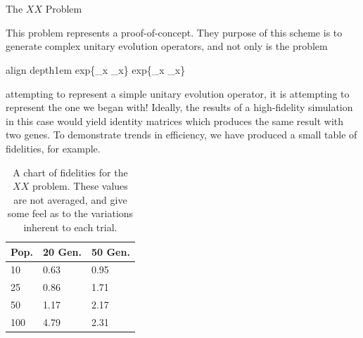 \documentclass[12pt]{beamer}
\renewcommand{\maketitle}{%
	\begin{center}%
		\Huge\inserttitle\\[5mm]%
		\Large\insertauthor\\[5mm]%
		\Large\insertinstitute%
	\end{center}%
	\vspace*{-1.5ex}%
}
\newcommand*\mystrut[1]{\vrule width0pt height0pt depth#1\relax}
\begin{document}
\begin{frame}{\maketitle}
\begin{columns}
\begin{column}{.45\textwidth}
	\begin{block}{The $XX$ Problem} \label{xx}

	This problem represents a proof-of-concept. They purpose of this scheme is to generate complex unitary evolution operators, and not only is the problem

	\begin{empheq}[box=\fbox]{align}
		\mystrut{1em} exp\{\sigma_x \otimes \sigma_x\} \mapsto exp\{\sigma_x \otimes \sigma_x\}
	\end{empheq}

	attempting to represent a simple unitary evolution operator, it is attempting to represent the one we began with! Ideally, the results of a high-fidelity simulation in this case would yield identity matrices which produces the same result with two genes. To demonstrate trends in efficiency, we have produced a small table of fidelities, for example. 

	\begin{table}[htpb]
		\centering
			\begin{tabular}{||l | l l ||} 
			\hline
				Pop. & 20 Gen. & 50 Gen. \\ [0.5ex] 
			\hline
				10  & 0.63   & 0.95      \\ 
				25  & 0.86   & 1.71      \\
				50  & 1.17   & 2.17      \\
				100 & 4.79   & 2.31      \\
			\hline
			\end{tabular}
		\centering
		\caption{A chart of fidelities for the $XX$ problem. These values are not averaged, and give some feel as to the variations inherent to each trial.}
	\end{table}


\end{block}
\end{column}
\end{columns}
\end{frame}
\end{document}
